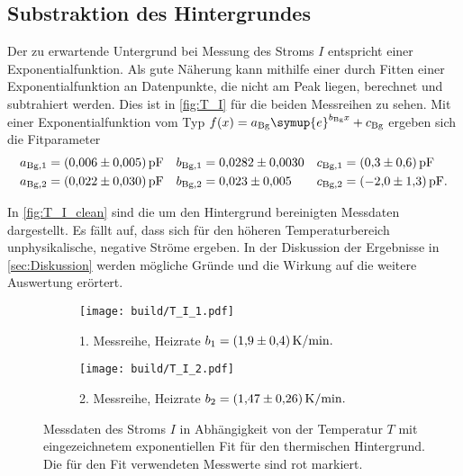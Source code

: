 \subsection{Substraktion des Hintergrundes}
\label{sec:Hintergrund}
Der zu erwartende Untergrund bei Messung des Stroms $I$ entspricht einer Exponentialfunktion. Als gute Näherung kann mithilfe einer durch Fitten einer Exponentialfunktion
an Datenpunkte, die nicht am Peak liegen, berechnet und subtrahiert werden. Dies ist in \autoref{fig:T_I} für die beiden Messreihen zu sehen. Mit einer Exponentialfunktion
vom Typ $f(x) = a_{\text{Bg}}\symup{e}^{b_{\text{Bg}}x} + c_{\text{Bg}}$ ergeben sich die Fitparameter
\begin{align*}
    a_{\text{Bg}, 1} & = \qty{0.006+-0.005}{\pico\farad} & b_{\text{Bg}, 1} &= \num{0.0282+-0.0030} & c_{\text{Bg}, 1} &= \qty{0.3+-0.6}{\pico\farad} \\
    a_{\text{Bg}, 2} & = \qty{0.022+-0.030}{\pico\farad} & b_{\text{Bg}, 2} &= \num{0.023+-0.005}   & c_{\text{Bg}, 2} &= \qty{-2.0+-1.3}{\pico\farad}. \\
\end{align*}

In \autoref{fig:T_I_clean} sind die um den Hintergrund bereinigten Messdaten dargestellt. Es fällt auf, dass sich für den höheren Temperaturbereich unphysikalische,
negative Ströme ergeben. In der Diskussion der Ergebnisse in \autoref{sec:Diskussion} werden mögliche Gründe und die Wirkung auf die weitere Auswertung erörtert.

\begin{figure}
    \centering
    \begin{subfigure}{\textwidth}
        \centering
        \texttt{[image: build/T\_I\_1.pdf]}
        \caption{1. Messreihe, Heizrate $b_1 = \qty{1.9+-0.4}{\kelvin\per\minute}.$}
        \label{fig:T_I_1}
    \end{subfigure}
    \begin{subfigure}{\textwidth}
        \centering
        \texttt{[image: build/T\_I\_2.pdf]}
        \caption{2. Messreihe, Heizrate $b_2 = \qty{1.47+-0.26}{\kelvin\per\minute}.$}
        \label{fig:T_I_2}
    \end{subfigure}
    \caption{Messdaten des Stroms $I$ in Abhängigkeit von der Temperatur $T$ mit eingezeichnetem exponentiellen Fit für den thermischen Hintergrund. Die für den Fit %
    verwendeten Messwerte sind rot markiert.}
    \label{fig:T_I}
\end{figure}



